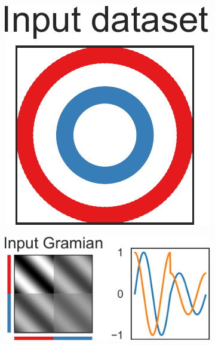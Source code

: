 \documentclass[twoside,11pt]{article}
\begin{document}
\begin{figure}[t]
	\centering
    
	\begin{subfigure}{.1203\linewidth}
		\includegraphics[width=\linewidth]{clustering/circles_eigendecomposition1.pdf}
		\caption{}
		\label{fig:2circles}
	\end{subfigure}%
	\hspace{2em}
    \begin{minipage}{.4\linewidth}
	\begin{subfigure}{.643\linewidth}
		\includegraphics[width=\linewidth]{clustering/circles_eigendecomposition2.pdf}

\end{subfigure}
\end{minipage}
\end{figure}
\end{document}
